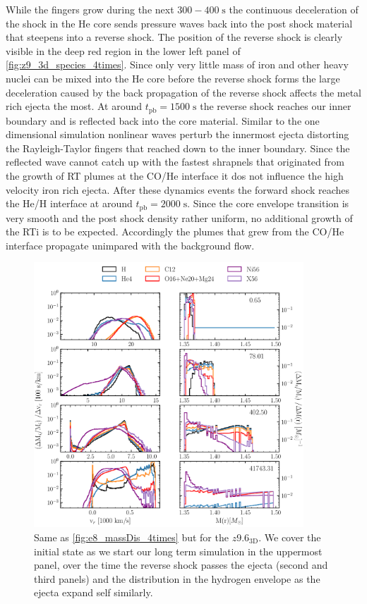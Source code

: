 \documentclass[fleqn,usenatbib]{mnras}
\begin{document}
While the fingers grow during the next $300-400\;\mathrm{s}$ the continuous deceleration of the shock in the He core sends pressure waves back into the post shock material that steepens into a reverse shock. The position of the reverse shock is clearly visible in the deep red region in the lower left panel of \autoref{fig:z9_3d_species_4times}. Since only very little mass of iron and other heavy nuclei can be mixed into the He core before the reverse shock forms the large deceleration caused by the back propagation of the reverse shock affects the metal rich ejecta the most.
At around $t_{\mathrm{pb}}=1500\;\mathrm{s}$ the reverse shock reaches our inner boundary and is reflected back into the core material.
Similar to the one dimensional simulation nonlinear waves perturb the innermost ejecta distorting the Rayleigh-Taylor fingers that reached down to the inner boundary. Since the reflected wave cannot catch up with the fastest shrapnels that originated from the growth of RT plumes at the CO/He interface it dos not influence the high velocity iron rich ejecta.
After these dynamics events the forward shock reaches the He/H interface at around $t_{\mathrm{pb}}=2000\;\mathrm{s}$. Since the core envelope transition is very smooth and the post shock density rather uniform, no additional growth of the RTi is to be expected. Accordingly the plumes that grew from the CO/He interface propagate unimpared with the background flow. 
\begin{figure}
 \label{fig:z9_massDis}
 \centering
 \includegraphics[width=0.9\textwidth]{pic/z93_3d_old_massDis_mvr_mas_4times.pdf}
 \caption{Same as \autoref{fig:e8_massDis_4times} but for the $z9.6_{\mathrm{3D}}$. We cover the initial state as we start our long term simulation in the uppermost panel, over the time the reverse shock passes the ejecta (second and third panels) and the distribution in the hydrogen envelope as the ejecta expand self similarly.}
\end{figure}
\end{document}

